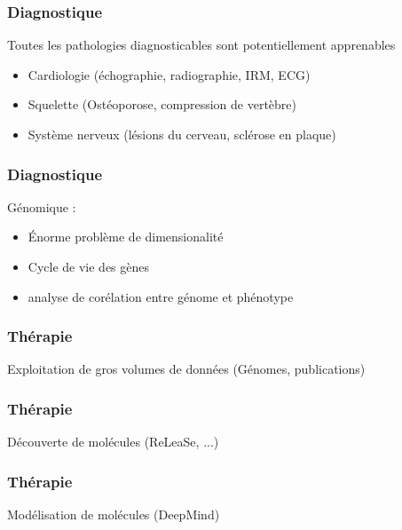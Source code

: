 \begin{frame}
  \frametitle{Diagnostique}
  Toutes les pathologies diagnosticables sont potentiellement apprenables
    \begin{itemize}
    \item Cardiologie (échographie, radiographie, IRM, ECG)
    \item Squelette (Ostéoporose, compression de vertèbre)
    \item Système nerveux (lésions du cerveau, sclérose en plaque)
    \end{itemize}
\end{frame}

\begin{frame}
  \frametitle{Diagnostique}
  Génomique :
  \newline
  \begin{minipage}[c]{0.49\linewidth}
    \begin{itemize}
    \item Énorme problème de dimensionalité
    \item Cycle de vie des gènes
    \item analyse de corélation entre génome et phénotype
    \end{itemize}
  \end{minipage}\hfill
  \begin{minipage}[c]{0.49\linewidth}
  \end{minipage}\hfill
\end{frame}

\begin{frame}
  \frametitle{Thérapie}
  Exploitation de gros volumes de données (Génomes, publications)
  \newline
  \newline
  \begin{minipage}[c]{0.49\linewidth}
  \end{minipage}\hfill
  \begin{minipage}[c]{0.49\linewidth}
  \end{minipage}\hfill
\end{frame}


\begin{frame}
  \frametitle{Thérapie}
  Découverte de molécules (ReLeaSe, ...) 
\end{frame}

\begin{frame}
  \frametitle{Thérapie}
  Modélisation de molécules (DeepMind)
\end{frame}

